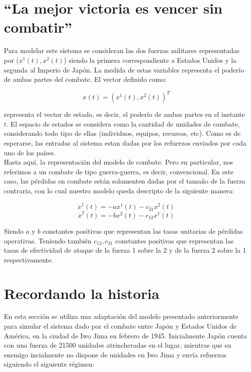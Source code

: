 \documentclass{sig-alternate}
\begin{document}
\section{``La mejor victoria es vencer sin combatir''}
Para modelar este sistema se consideran las dos fuerzas militares representadas por ($x^1(t), x^2(t)$) siendo la primera correspondiente a Estados
Unidos y la segunda al Imperio de Japón. La medida de estas variables representa el poderío de ambas partes del combate. 
El vector definido como:

\begin{equation}
x(t) = ( x^1(t), x^2(t) )^T \label{eq:state_vector}
\end{equation}

representa el vector de estado, es decir, el poderío de ambas partes en el instante $t$. El espacio de estados se considera como la cantidad de 
unidades de combate, considerando todo tipo de ellas (individuos, equipos, recursos, etc). Como es de esperarse, las entradas al sistema estan 
dadas por los refuerzos enviados por cada uno de los países.\\
Hasta aquí, la representación del modelo de combate. Pero en particular, nos referimos a un combate de tipo guerra-guerra, es decir, convencional.
En este caso, las pérdidas en combate están solamenten dadas por el tamaño de la fuerza contraria, con lo cual nuestro modelo queda descripto de la
siguiente manera:

\begin{equation}
\dot{x}^1(t) = -ax^1(t) - c_{21} x^2(t)\end{equation}
\begin{equation}
\dot{x}^2(t) = -bx^2(t) - c_{12} x^1(t)\end{equation}

Siendo $a$ y $b$ constantes positivas que representan las tasas unitarias de pérdidas operativas. Teniendo también $c_{12}, c_{21}$ 
constantes positivas que representan las tasas de efectividad de ataque de la fuerza 1 sobre la 2 y de la fuerza 2 sobre la 1 respectivamente.

\section{Recordando la historia}

En esta sección se utiliza una adaptación del modelo presentado anteriormente para simular el sistema dado por el combate entre Japón y 
Estados Unidos de América, en la ciudad de Iwo Jima en febrero de 1945. Inicialmente Japón cuenta con una fuerza de 21500 unidades 
atrincheradas en el lugar, mientras que su enemigo incialmente no dispone de unidades en Iwo Jima y envía refuerzos siguiendo el siguiente 
régimen:
\end{document}
